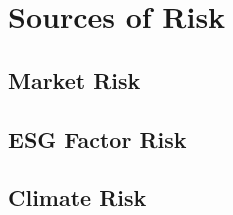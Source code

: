 \chapter{Sources of Risk}


\section{Market Risk}

\section{ESG Factor Risk}

\section{Climate Risk}